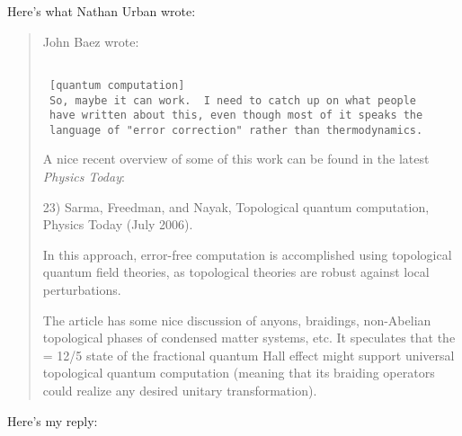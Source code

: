 Here's what Nathan Urban wrote:

\begin{quote}
John Baez wrote:


\begin{verbatim}

 [quantum computation]
 So, maybe it can work.  I need to catch up on what people 
 have written about this, even though most of it speaks the 
 language of "error correction" rather than thermodynamics.
\end{verbatim}
    

A nice recent overview of some of this work can be found in the 
latest \emph{Physics Today}:

23) Sarma, Freedman, and Nayak, Topological quantum
computation, Physics Today (July 2006).

In this approach, error-free computation is accomplished using
topological quantum field theories, as topological theories are robust
against local perturbations.

The article has some nice discussion of anyons, braidings, non-Abelian
topological phases of condensed matter systems, etc.  It speculates
that the \nu  = 12/5 state of the fractional quantum Hall effect might
support universal topological quantum computation (meaning that its
braiding operators could realize any desired unitary transformation).
\end{quote}

Here's my reply:

